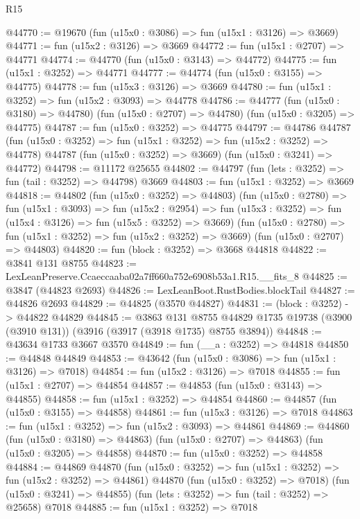 \begin{lexlean}{R15}
\begin{coremodule}
@44770 := @19670 (fun (u15x0 : @3086) => fun (u15x1 : @3126) => @3669)
@44771 := fun (u15x2 : @3126) => @3669
@44772 := fun (u15x1 : @2707) => @44771
@44774 := @44770 (fun (u15x0 : @3143) => @44772)
@44775 := fun (u15x1 : @3252) => @44771
@44777 := @44774 (fun (u15x0 : @3155) => @44775)
@44778 := fun (u15x3 : @3126) => @3669
@44780 := fun (u15x1 : @3252) => fun (u15x2 : @3093) => @44778
@44786 := @44777
    (fun (u15x0 : @3180) => @44780)
    (fun (u15x0 : @2707) => @44780)
    (fun (u15x0 : @3205) => @44775)
@44787 := fun (u15x0 : @3252) => @44775
@44797 := @44786
    @44787
    (fun (u15x0 : @3252) => fun (u15x1 : @3252) => fun (u15x2 : @3252) => @44778)
    @44787
    (fun (u15x0 : @3252) => @3669)
    (fun (u15x0 : @3241) => @44772)
@44798 := @11172 @25655
@44802 := @44797 (fun (lets : @3252) => fun (tail : @3252) => @44798) @3669
@44803 := fun (u15x1 : @3252) => @3669
@44818 := @44802
    (fun (u15x0 : @3252) => @44803)
    (fun (u15x0 : @2780) =>
    fun (u15x1 : @3093) =>
    fun (u15x2 : @2954) =>
    fun (u15x3 : @3252) => fun (u15x4 : @3126) => fun (u15x5 : @3252) => @3669)
    (fun (u15x0 : @2780) => fun (u15x1 : @3252) => fun (u15x2 : @3252) => @3669)
    (fun (u15x0 : @2707) => @44803)
@44820 := fun (block : @3252) => @3668 @44818
@44822 := @3841 @131 @8755
@44823 := LexLeanPreserve.Ccaeccaaba02a7ff660a752e6908b53a1.R15.__fits_8
@44825 := @3847 (@44823 @2693)
@44826 := LexLeanBoot.RustBodies.blockTail
@44827 := @44826 @2693
@44829 := @44825 (@3570 @44827)
@44831 := (block : @3252) -> @44822 @44829
@44845 := @3863
    @131
    @8755
    @44829
    @1735
    @19738
    (@3900 (@3910 @131))
    (@3916 (@3917 (@3918 @1735) @8755 @3894))
@44848 := @43634 @1733 @3667 @3570
@44849 := fun (__a : @3252) => @44818
@44850 := @44848 @44849
@44853 := @43642 (fun (u15x0 : @3086) => fun (u15x1 : @3126) => @7018)
@44854 := fun (u15x2 : @3126) => @7018
@44855 := fun (u15x1 : @2707) => @44854
@44857 := @44853 (fun (u15x0 : @3143) => @44855)
@44858 := fun (u15x1 : @3252) => @44854
@44860 := @44857 (fun (u15x0 : @3155) => @44858)
@44861 := fun (u15x3 : @3126) => @7018
@44863 := fun (u15x1 : @3252) => fun (u15x2 : @3093) => @44861
@44869 := @44860
    (fun (u15x0 : @3180) => @44863)
    (fun (u15x0 : @2707) => @44863)
    (fun (u15x0 : @3205) => @44858)
@44870 := fun (u15x0 : @3252) => @44858
@44884 := @44869
    @44870
    (fun (u15x0 : @3252) => fun (u15x1 : @3252) => fun (u15x2 : @3252) => @44861)
    @44870
    (fun (u15x0 : @3252) => @7018)
    (fun (u15x0 : @3241) => @44855)
    (fun (lets : @3252) => fun (tail : @3252) => @25658)
    @7018
@44885 := fun (u15x1 : @3252) => @7018

\end{coremodule}
\end{lexlean}
